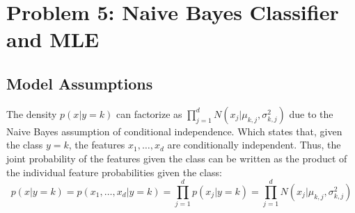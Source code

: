\documentclass[11pt, a4paper, oneside]{memoir}
\begin{document}
\chapter{Problem 5: Naive Bayes Classifier and MLE}
\section{Model Assumptions}
The density $p(x | y = k)$ can factorize as $\prod_{j=1}^{d} N(x_j | \mu_{k,j}, \sigma^2_{k,j})$ due to the Naive Bayes assumption of conditional independence.
Which states that, given the class $y=k$, the features $x_1, \dots, x_d$ are conditionally independent.
Thus, the joint probability of the features given the class can be written as the product of the individual feature probabilities given the class:
\[ p(x | y = k) = p(x_1, \dots, x_d | y = k) = \prod_{j=1}^{d} p(x_j | y = k) = \prod_{j=1}^{d} N(x_j | \mu_{k,j}, \sigma^2_{k,j}) \]
\end{document}
